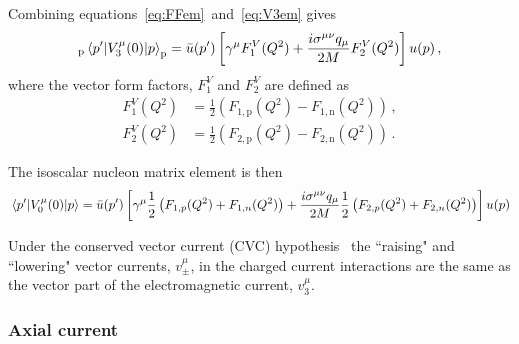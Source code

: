    Combining equations~\ref{eq:FFem}~and~\ref{eq:V3em} gives
    \begin{equation}
      _{\textrm{p}}\mel{p'}{V^{\mu}_3(0)}{p}_{\textrm{p}} 
        = \bar{u}(p') \left[\gamma^{\mu}F_1^V(Q^2) 
          + \frac{i\sigma^{\mu\nu}q_{\mu}}{2M}F_2^V(Q^2)\right] u(p) \,,
    \end{equation}
    where the vector form factors, $F_1^V$ and $F_2^V$ are defined as
    \begin{equation}
      \begin{aligned}
        F_1^V(Q^2) &= \frac{1}{2}\left( F_{1,\textrm{p}}(Q^2) - F_{1,\textrm{n}}(Q^2)\right) \,, \\
        F_2^V(Q^2) &= \frac{1}{2}\left( F_{2,\textrm{p}}(Q^2) - F_{2,\textrm{n}}(Q^2)\right) \,.
      \end{aligned}
    \end{equation}

    The isoscalar nucleon matrix element is then
    \begin{equation}
      {\mel{p'}{V^{\mu}_0(0)}{p}}
      = \bar{u}(p')\left[\gamma^{\mu}\frac{1}{2}\left(F_{1,p}(Q^2) + F_{1,n}(Q^2)\right) 
        + \frac{i\sigma^{\mu\nu}q_{\mu}}{2M}\frac{1}{2}\left(F_{2,p}(Q^2) + F_{2,n}(Q^2)\right)\right]u(p)
    \end{equation}
 
    Under the conserved vector current (CVC)
  hypothesis~\cite{Gerstein:1956,Feynman:1958ty} the ``raising" and ``lowering"
  vector currents, $v^{\mu}_{\pm}$, in the charged current interactions are the
  same as the vector part of the electromagnetic current, $v^{\mu}_{3}$.

  \subsubsection{Axial current}

